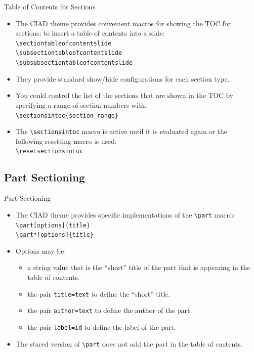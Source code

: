 \documentclass[english,sectioncirclenumberstyle]{ciadbeamer}
\begin{document}
\begin{frame}{Table of Contents for Sections}
	\begin{itemize}
	\item The CIAD theme provides convenient macros for showing the TOC for sections: to insert a table of contents into a slide: \\
		\texttt{{\textbackslash}sectiontableofcontentslide} \\
		\texttt{{\textbackslash}subsectiontableofcontentslide} \\
		\texttt{{\textbackslash}subsubsectiontableofcontentslide}
	\item They provide standard show/hide configurations for each section type.
	\item You could control the list of the sections that are shown in the TOC by specifying a range of section numbers with: \\
		\texttt{{\textbackslash}sectionsintoc\{section\_range\}}
	\item The \texttt{{\textbackslash}sectionsintoc} macro is active until it is evaluated again or the following resetting macro is used: \\
		\texttt{{\textbackslash}resetsectionsintoc}
	\end{itemize}
\end{frame}

\subsection{Part Sectioning}

\begin{frame}{Part Sectioning}
	\begin{itemize}
	\item The CIAD theme provides specific implementations of the \texttt{{\textbackslash}part} macro: \\
		\texttt{{\textbackslash}part[options]\{title\}} \\
		\texttt{{\textbackslash}part*[options]\{title\}}
	\vfill
	\item Options may be: \begin{itemize}
		\item a string value that is the ``short'' title of the part that is appearing in the table of contents.
		\item the pair \texttt{title=text} to define the ``short'' title.
		\item the pair \texttt{author=text} to define the author of the part.
		\item the pair \texttt{label=id} to define the label of the part.
		\end{itemize}
	\vfill
	\item The stared version of \texttt{{\textbackslash}part} does not add the part in the table of contents.
	\end{itemize}
\end{frame}
\end{document}
